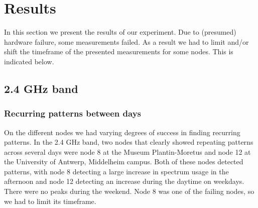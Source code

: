 \documentclass[a4paper, 11pt]{article}
\begin{document}
\section{Results}
In this section we present the results of our experiment. Due to (presumed) hardware failure, some measurements failed. As a result we had to limit and/or shift the timeframe of the presented measurements for some nodes. This is indicated below.
\subsection{2.4 GHz band}
\subsubsection{Recurring patterns between days} 
On the different nodes we had varying degrees of success in finding recurring patterns. In the 2.4 GHz band, two nodes that clearly showed repeating patterns across several days were node 8 at the Museum Plantin-Moretus and node 12 at the University of Antwerp, Middelheim campus. Both of these nodes detected patterns, with node 8 detecting a large increase in spectrum usage in the afternoon and node 12 detecting an increase during the daytime on weekdays. There were no peaks during the weekend. Node 8 was one of the failing nodes, so we had to limit its timeframe.
\end{document}
